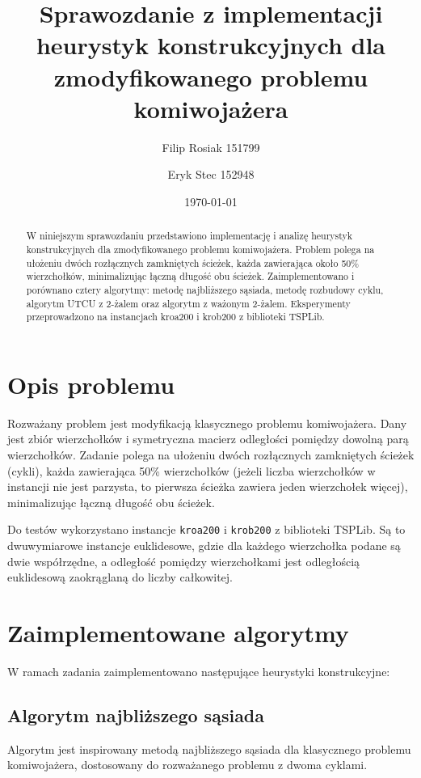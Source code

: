 \documentclass[12pt,a4paper]{article}
\title{Sprawozdanie z implementacji heurystyk konstrukcyjnych dla zmodyfikowanego problemu komiwojażera}
\author{Filip Rosiak 151799  \and Eryk Stec 152948}
\date{\today}
\begin{document}
\maketitle

\begin{abstract}
W niniejszym sprawozdaniu przedstawiono implementację i analizę heurystyk konstrukcyjnych dla zmodyfikowanego problemu komiwojażera. Problem polega na ułożeniu dwóch rozłącznych zamkniętych ścieżek, każda zawierająca około 50\% wierzchołków, minimalizując łączną długość obu ścieżek. Zaimplementowano i porównano cztery algorytmy: metodę najbliższego sąsiada, metodę rozbudowy cyklu, algorytm UTCU z 2-żalem oraz algorytm z ważonym 2-żalem. Eksperymenty przeprowadzono na instancjach kroa200 i krob200 z biblioteki TSPLib.
\end{abstract}

\section{Opis problemu}
Rozważany problem jest modyfikacją klasycznego problemu komiwojażera. Dany jest zbiór wierzchołków i symetryczna macierz odległości pomiędzy dowolną parą wierzchołków. Zadanie polega na ułożeniu dwóch rozłącznych zamkniętych ścieżek (cykli), każda zawierająca 50\% wierzchołków (jeżeli liczba wierzchołków w instancji nie jest parzysta, to pierwsza ścieżka zawiera jeden wierzchołek więcej), minimalizując łączną długość obu ścieżek.

Do testów wykorzystano instancje \texttt{kroa200} i \texttt{krob200} z biblioteki TSPLib. Są to dwuwymiarowe instancje euklidesowe, gdzie dla każdego wierzchołka podane są dwie współrzędne, a odległość pomiędzy wierzchołkami jest odległością euklidesową zaokrąglaną do liczby całkowitej.

\section{Zaimplementowane algorytmy}
W ramach zadania zaimplementowano następujące heurystyki konstrukcyjne:

\subsection{Algorytm najbliższego sąsiada}
Algorytm jest inspirowany metodą najbliższego sąsiada dla klasycznego problemu komiwojażera, dostosowany do rozważanego problemu z dwoma cyklami.
\end{document}
